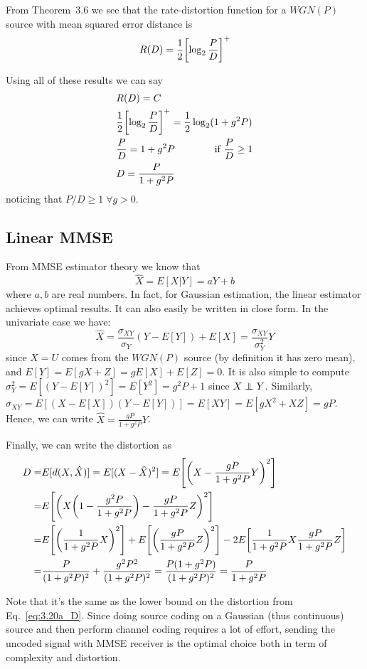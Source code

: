 From Theorem~3.6 we see that the rate-distortion function for a $WGN(P)$ source with mean squared error distance is
%
\begin{equation}
R(D) = \frac{1}{2} \qty[\log_2 \frac{P}{D}]^+
\end{equation}

Using all of these results we can say
%
\begin{align}\label{eq:3.20a_D}
\begin{split}
&R(D)=C\\
&\frac{1}{2} \qty[\log_2 \frac{P}{D}]^+ = \frac{1}{2} \log_2(1+g^2P) \\
&\frac{P}{D} = 1+g^2P \qquad\qquad \mbox{if } \frac{P}{D} \geq 1\\
&D= \frac{P}{1+g^2P}
\end{split}
\end{align}
%
noticing that $P/D \geq 1 \; \forall g>0$.

\subsection{Linear MMSE}
From MMSE estimator theory we know that
%
\begin{equation}
\hat{X} = E[X|Y] = aY+b
\end{equation}
%
where $a,b$ are real numbers. In fact, for Gaussian estimation, the linear estimator achieves optimal results. It can also easily be written in close form. In the univariate case we have:
%
\begin{equation}
\hat{X} = \frac{\sigma_{XY}}{\sigma_Y} (Y-E[Y]) + E[X] = \frac{\sigma_{XY}}{\sigma_Y^2} Y
\end{equation}
%
since $X=U$ comes from the $WGN(P)$ source (by definition it has zero mean), and $E[Y]=E[gX+Z] = gE[X]+E[Z] = 0$. It is also simple to compute $\sigma_Y^2 = E[(Y-E[Y])^2] = E[Y^2] = g^2P+1$ since $X\independent Y$. Similarly, $\sigma_{XY} = E[(X-E[X])(Y-E[Y])] = E[XY] = E[gX^2+XZ] = gP$.\\
Hence, we can write $\hat{X} = \frac{gP}{1+g^2P}Y$.

Finally, we can write the distortion as
%
\begin{align}
\begin{split}
D =& E[d(X,\hat{X})] = E[(X-\hat{X})^2] = E \qty[\qty(X-\frac{gP}{1+g^2P}Y)^2]\\
=& E \qty[\qty( X \qty(1-\frac{g^2P}{1+g^2P}) - \frac{gP}{1+g^2P}Z)^2]\\
=& E \qty[\qty( \frac{1}{1+g^2P}X)^2] + E\qty[\qty( \frac{gP}{1+g^2P}Z)^2] - 2E\qty[ \frac{1}{1+g^2P}X \frac{gP}{1+g^2P}Z ]\\
=& \frac{P}{(1+g^2P)^2} + \frac{g^2P^2}{(1+g^2P)^2} = \frac{P(1+g^2P)}{(1+g^2P)^2} = \frac{P}{1+g^2P}
\end{split}
\end{align}

Note that it's the same as the lower bound on the distortion from Eq.~\eqref{eq:3.20a_D}. Since doing source coding on a Gaussian (thus continuous) source and then perform channel coding requires a lot of effort, sending the uncoded signal with MMSE receiver is the optimal choice both in term of complexity and distortion.

